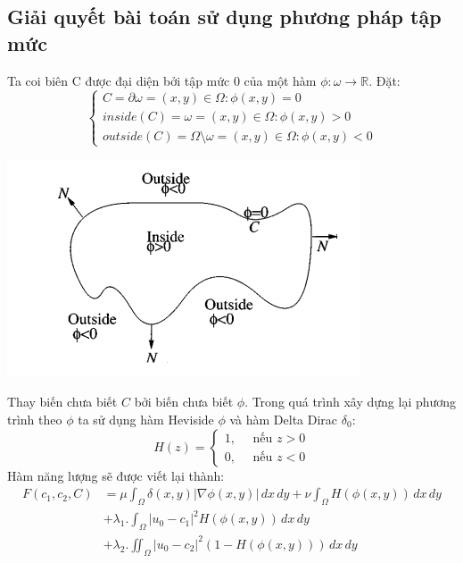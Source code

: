 \documentclass[12pt, oneside, a4paper]{book}
\begin{document}
\subsection{Giải quyết bài toán sử dụng phương pháp tập mức}
Ta coi biên C được đại diện bởi tập mức 0 của một hàm $\phi: \omega \rightarrow \mathbb{R}$. Đặt:
\begin{equation*}
\begin{cases}
 C= \partial \omega ={(x,y)\in \Omega: \phi(x,y)=0}\\
 inside(C)= \omega={(x,y)\in \Omega: \phi(x,y)>0}\\
 outside(C)=\Omega \setminus \omega ={(x,y)\in \Omega: \phi(x,y)<0}
   \end{cases}
\end{equation*}
 \begin{center}
\includegraphics[scale=0.6]{figure/insideoutside.png}
\end{center}
Thay biến chưa biết $C$ bởi biến chưa biết $\phi$.  Trong quá trình xây dựng lại phương trình theo $\phi$ ta sử dụng hàm Heviside $\phi$ và hàm Delta Dirac $\delta_0$: 
 \begin{equation*}
 H(z)=
\begin{cases}
 1 , \quad \text{ nếu } z>0\\
0 , \quad \text{ nếu } z<0
   \end{cases}
\end{equation*}
Hàm năng lượng sẽ được viết lại thành:
\begin{equation*}
\begin{split}
F(c_1, c_2, C)&=\mu \int_{\Omega}\delta(x,y)|\nabla \phi(x,y)|\,dx\,dy+\nu  \int_{\Omega}H( \phi(x,y))\,dx\,dy \\ 
&+\lambda_1 .\int_{\Omega} |u_0-c_1|^2H(\phi(x,y)) \,dx\,dy\\&+\lambda_2 .\iint_{\Omega} |u_0-c_2|^2(1-H(\phi(x,y))) \,dx\,dy
\end{split}
\end{equation*}
\end{document}
